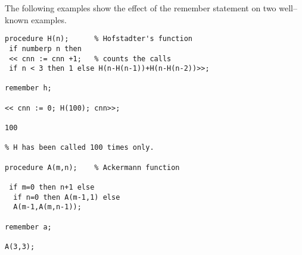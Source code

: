 The following examples show the effect of the remember statement
on two well--known examples.

\begin{samepage}
\begin{verbatim}
procedure H(n);      % Hofstadter's function
 if numberp n then
 << cnn := cnn +1;   % counts the calls
 if n < 3 then 1 else H(n-H(n-1))+H(n-H(n-2))>>;

remember h;

<< cnn := 0; H(100); cnn>>;

100

% H has been called 100 times only.

procedure A(m,n);    % Ackermann function

 if m=0 then n+1 else
  if n=0 then A(m-1,1) else
  A(m-1,A(m,n-1));

remember a;

A(3,3);

\end{verbatim}
\end{samepage}

